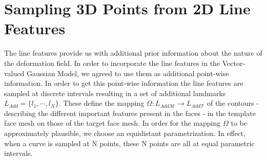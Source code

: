 \section{Sampling 3D Points from 2D Line Features} 
The line features provide us with additional prior information about the nature of the deformation field. In order to incorporate the line features in the Vector-valued Gaussian Model, we agreed to use them as additional point-wise information. In order to get this point-wise information the line features are sampled at discrete intervals resulting in a set of additional landmarks $L_{Add} = \{l_{1}, \cdots, l_{N}\}$. These
define the mapping $\Omega:L_{Add\mathcal{M}} \rightarrow L_{Add\mathcal{T}}$ of the contours - describing the different important features present in the faces - in the template face mesh on those of the target face mesh. In order for the mapping $\Omega$ to be approximately plausible, we choose an equidistant parametrization. In effect, when a curve is sampled at N points, these N points are all at equal parametric intervals.

\def\earpathf{(-1,1.5) .. controls (-1,2.3) and (1,2.8) .. (1,1.5) .. controls (1, -.2) and (0.3,-.1) .. (0.3,-1) .. controls (0.2,-1.5) and (-.5, -1.7) .. (-1,-1.25);}
\def\earpathl{(3,2) .. controls (3,3.3) and (5.6,3.7) .. (5.6,2) .. controls (5.6, 0) and (4.6,0) .. (4.6,-1.3) .. controls (4.6,-2) and (3.5, -2) .. (3,-1.5);}


